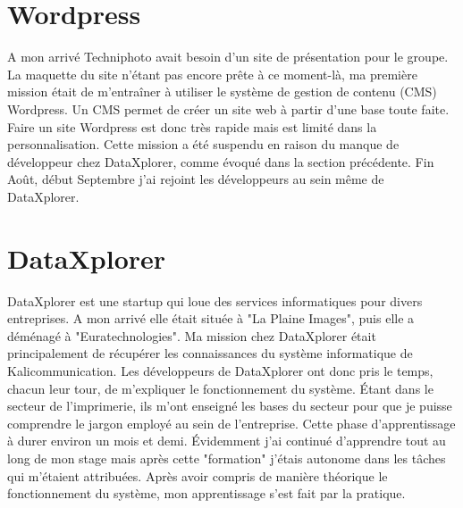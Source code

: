 
\section{Wordpress}
A mon arrivé Techniphoto avait besoin d'un site de présentation pour le groupe. La maquette du site n'étant pas encore prête à ce moment-là, ma première mission était de m'entraîner à utiliser le système de gestion de contenu (CMS) Wordpress. Un CMS permet de créer un site web à partir d'une base toute faite. Faire un site Wordpress est donc très rapide mais est limité dans la personnalisation.\newline
Cette mission a été suspendu en raison du manque de développeur chez DataXplorer, comme évoqué dans la section précédente. Fin Août, début Septembre j'ai rejoint les développeurs au sein même de DataXplorer.

\section{DataXplorer}
DataXplorer est une startup qui loue des services informatiques pour divers entreprises. A mon arrivé elle était située à "La Plaine Images", puis elle a déménagé à "Euratechnologies". Ma mission chez DataXplorer était principalement de récupérer les connaissances du système informatique de Kalicommunication. Les développeurs de DataXplorer ont donc pris le temps, chacun leur tour, de m'expliquer le fonctionnement du système. Étant dans le secteur de l'imprimerie, ils m'ont enseigné les bases du secteur pour que je puisse comprendre le jargon employé au sein de l'entreprise. Cette phase d'apprentissage à durer environ un mois et demi. Évidemment j'ai continué d'apprendre tout au long de mon stage mais après cette "formation" j'étais autonome dans les tâches qui m'étaient attribuées.\newline
Après avoir compris de manière théorique le fonctionnement du système, mon apprentissage s'est fait par la pratique.
